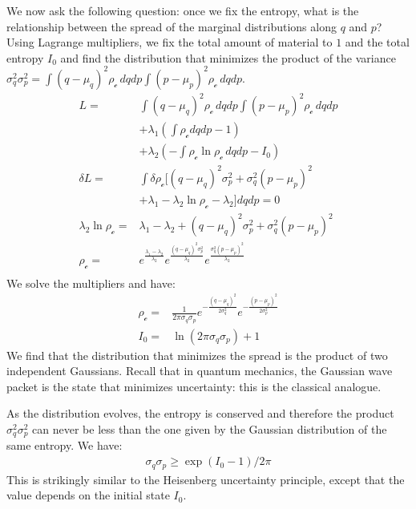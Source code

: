 \documentclass[aps,pra,10pt,twocolumn,floatfix,nofootinbib]{revtex4-1}
\numberwithin{equation}{section}
\theoremstyle{definition}
\begin{document}
We now ask the following question: once we fix the entropy, what is the relationship between the spread of the marginal distributions along $q$ and $p$? Using Lagrange multipliers, we fix the total amount of material to $1$ and the total entropy $I_0$ and find the distribution that minimizes the product of the variance $\sigma_q^2 \sigma_p^2 = \int (q-\mu_q)^2 \rho_{\mathcal{c}} \, dqdp \int (p-\mu_p)^2 \rho_{\mathcal{c}} \, dqdp$.
\begin{align*}
L = &\int (q-\mu_q)^2 \rho_{\mathcal{c}} \, dqdp \int (p-\mu_p)^2 \rho_{\mathcal{c}} \, dqdp \\
&+ \lambda_1(\int \rho_{\mathcal{c}} dqdp - 1)\\
&+ \lambda_2(- \int \rho_{\mathcal{c}} \ln \rho_{\mathcal{c}} \, dqdp - I_0)\\
\delta L = &\int \delta \rho_{\mathcal{c}} [(q-\mu_q)^2 \sigma_p^2 + \sigma_q^2 (p-\mu_p)^2 \\ &+ \lambda_1 - \lambda_2 \ln \rho_{\mathcal{c}} - \lambda_2 ] dqdp = 0 \\
\lambda_2 \ln \rho_{\mathcal{c}} = &\lambda_1 - \lambda_2 + (q-\mu_q)^2 \sigma_p^2 + \sigma_q^2 (p-\mu_p)^2 \\
\rho_{\mathcal{c}} = &e^{\frac{\lambda_1 - \lambda_2}{\lambda_2}}e^{\frac{(q-\mu_q)^2 \sigma_p^2}{\lambda_2}}e^{\frac{\sigma_q^2 (p-\mu_p)^2}{\lambda_2}}\\
\end{align*}
We solve the multipliers and have:
\begin{align*}
\rho_{\mathcal{c}} = &\frac{1}{ 2 \pi \sigma_q \sigma_p} e^{-\frac{(q-\mu_q)^2}{2\sigma_q^2}} e^{-\frac{(p-\mu_p)^2}{2\sigma_p^2}} \\
I_0 = &\ln (2\pi\sigma_q\sigma_p) + 1
\end{align*}
We find that the distribution that minimizes the spread is the product of two independent Gaussians. Recall that in quantum mechanics, the Gaussian wave packet is the state that minimizes uncertainty: this is the classical analogue.

As the distribution evolves, the entropy is conserved and therefore the product $\sigma_q^2 \sigma_p^2$ can never be less than the one given by the Gaussian distribution of the same entropy. We have:
\begin{align*}
\sigma_q\sigma_p \geq \exp (I_0 - 1) / 2 \pi 
\end{align*}
This is strikingly similar to the Heisenberg uncertainty principle, except that the value depends on the initial state $I_0$.
\end{document}
